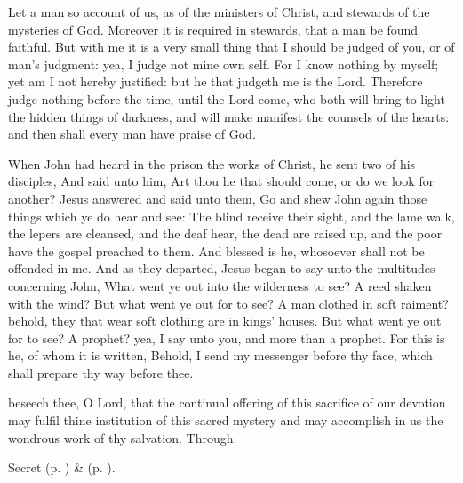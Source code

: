 Let a man so account of us, as of the ministers of Christ, and stewards of the mysteries of God. Moreover it is required in stewards, that a man be found faithful. But with me it is a very small thing that I should be judged of you, or of man's judgment: yea, I judge not mine own self. For I know nothing by myself; yet am I not hereby justified: but he that judgeth me is the Lord. Therefore judge nothing before the time, until the Lord come, who both will bring to light the hidden things of darkness, and will make manifest the counsels of the hearts: and then shall every man have praise of God.


 When John had heard in the prison the works of Christ, he sent two of his disciples, And said unto him, Art thou he that should come, or do we look for another? Jesus answered and said unto them, Go and shew John again those things which ye do hear and see: The blind receive their sight, and the lame walk, the lepers are cleansed, and the deaf hear, the dead are raised up, and the poor have the gospel preached to them. And blessed is he, whosoever shall not be offended in me. And as they departed, Jesus began to say unto the multitudes concerning John, What went ye out into the wilderness to see? A reed shaken with the wind? But what went ye out for to see? A man clothed in soft raiment? behold, they that wear soft clothing are in kings' houses. But what went ye out for to see? A prophet? yea, I say unto you, and more than a prophet. For this is he, of whom it is written, Behold, I send my messenger before thy face, which shall prepare thy way before thee.


\clearpage
\secret
{} beseech thee, O Lord, that the continual offering of this sacrifice of our devotion may fulfil thine institution of this sacred mystery and may accomplish in us the wondrous work of thy salvation. Through.
\begin{rubric}
     Secret  (p. \pageref{AdventISecret}) \&   (p. \pageref{SPMaryInAdvent}).
\end{rubric}

